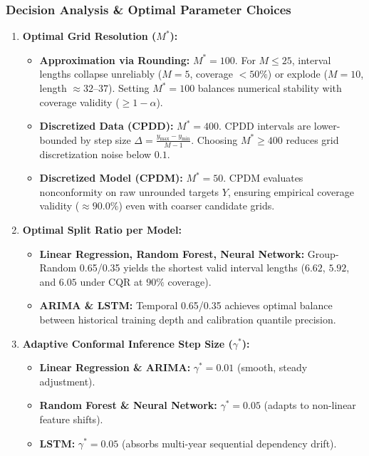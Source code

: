 \documentclass[11pt,a4paper]{article}
\begin{document}
\subsubsection{Decision Analysis \& Optimal Parameter Choices}
\begin{enumerate}
    \item \textbf{Optimal Grid Resolution ($M^*$):}
    \begin{itemize}
        \item \textbf{Approximation via Rounding:} $M^* = 100$. For $M \le 25$, interval lengths collapse unreliably ($M=5$, coverage $< 50\%$) or explode ($M=10$, length $\approx 32$--$37$). Setting $M^* = 100$ balances numerical stability with coverage validity ($\ge 1-\alpha$).
        \item \textbf{Discretized Data (CPDD):} $M^* = 400$. CPDD intervals are lower-bounded by step size $\Delta = \frac{y_{\max} - y_{\min}}{M-1}$. Choosing $M^* \ge 400$ reduces grid discretization noise below $0.1$.
        \item \textbf{Discretized Model (CPDM):} $M^* = 50$. CPDM evaluates nonconformity on raw unrounded targets $Y$, ensuring empirical coverage validity ($\approx 90.0\%$) even with coarser candidate grids.
    \end{itemize}
    \item \textbf{Optimal Split Ratio per Model:}
    \begin{itemize}
        \item \textbf{Linear Regression, Random Forest, Neural Network:} Group-Random 0.65/0.35 yields the shortest valid interval lengths ($6.62$, $5.92$, and $6.05$ under CQR at $90\%$ coverage).
        \item \textbf{ARIMA \& LSTM:} Temporal 0.65/0.35 achieves optimal balance between historical training depth and calibration quantile precision.
    \end{itemize}
    \item \textbf{Adaptive Conformal Inference Step Size ($\gamma^*$):}
    \begin{itemize}
        \item \textbf{Linear Regression \& ARIMA:} $\gamma^* = 0.01$ (smooth, steady adjustment).
        \item \textbf{Random Forest \& Neural Network:} $\gamma^* = 0.05$ (adapts to non-linear feature shifts).
        \item \textbf{LSTM:} $\gamma^* = 0.05$ (absorbs multi-year sequential dependency drift).
    \end{itemize}
\end{enumerate}
\end{document}
